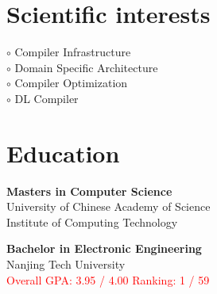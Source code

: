 \documentclass[a4paper,10pt]{article}
\begin{document}
\begin{adjustbox}{valign=t}
\begin{minipage}{0.3\textwidth}
\section*{Scientific interests}
\raggedright
\textcolor{ColorOne}{$\circ$} Compiler Infrastructure \\
\textcolor{ColorOne}{$\circ$} Domain Specific Architecture \\
\textcolor{ColorOne}{$\circ$} Compiler Optimization\\
\textcolor{ColorOne}{$\circ$} DL Compiler

\vfill

\section*{Education}
	\begin{description}
	\raggedright

	\item [\normalfont \textcolor{ColorOne}{Aug. 2021 - Present}] \textbf{Masters in Computer Science}\\
	University of Chinese Academy of Science \\
	Institute of Computing Technology

	\item [\normalfont \textcolor{ColorOne}{Aug. 2017 - Jun. 2021}] \textbf{Bachelor in Electronic Engineering} \\ 
	Nanjing Tech University \\
	\textcolor{red}{Overall GPA:  3.95 / 4.00}
	\textcolor{red}{Ranking:  1 / 59}
	
\end{description}

\vfill
\end{minipage}
\end{adjustbox}
%
%
%
\hfill
\begin{adjustbox}{valign=t}
\begin{minipage}{0.05\textwidth} %
\MyVerticalRule  %
\end{minipage}
\end{adjustbox}
\hfill
%
\end{document}
